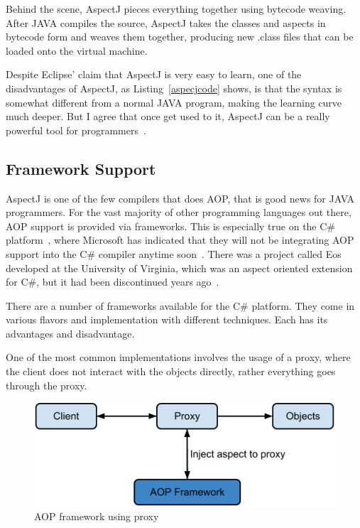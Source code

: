 Behind the scene, AspectJ pieces everything together using bytecode weaving. After JAVA compiles the source, AspectJ takes the classes and aspects in bytecode form and weaves them together, producing new .class files that can be loaded onto the virtual machine.

Despite Eclipse' claim that AspectJ is very easy to learn, one of the disadvantages of AspectJ, as Listing~\ref{aspecjcode} shows, is that the syntax is somewhat different from a normal JAVA program, making the learning curve much deeper. But I agree that once get used to it, AspectJ can be a really powerful tool for programmers~\cite{aspectj_text}.

\subsection{Framework Support}

AspectJ is one of the few compilers that does AOP, that is good news for JAVA programmers. For the vast majority of other programming languages out there, AOP support is provided via frameworks. This is especially true on the C\# platform~\cite{aopcs}, where Microsoft has indicated that they will not be integrating AOP support into the C\# compiler anytime soon~\cite{mastermind_text}. There was a project called Eos developed at the University of Virginia, which was an aspect oriented extension for C\#, but it had been discontinued years ago~\cite{eos_site, eos}.

There are a number of frameworks available for the C\# platform. They come in various flavors and implementation with different techniques. Each has its advantages and disadvantage.

One of the most common implementations involves the usage of a proxy, where the client does not interact with the objects directly, rather everything goes through the proxy.

\begin{figure}[here]
  \includegraphics[scale=0.70]{proxy.png}
  \centering
  \caption{AOP framework using proxy\label{proxy_model}}
\end{figure}

